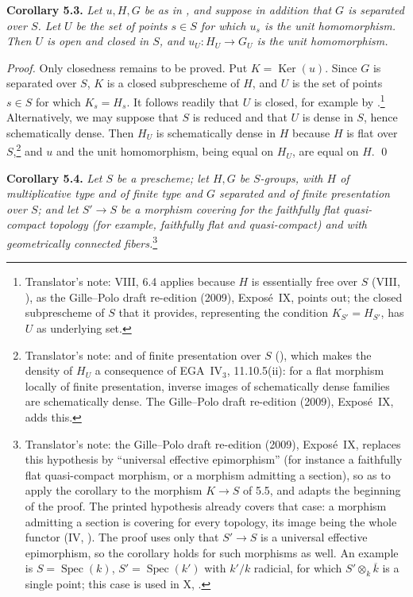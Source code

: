 \medskip
\noindent{}\textbf{Corollary 5.3.}
\textit{Let \(u,H,G\) be as in
, and suppose in addition that \(G\)
is separated over \(S\). Let \(U\) be the set of points \(s\in S\) for
which \(u_s\) is the unit homomorphism. Then \(U\) is open and closed
in \(S\), and \(u_U:H_U\to G_U\) is the unit homomorphism.}

\emph{Proof.}
Only closedness remains to be proved. Put \(K=\operatorname{Ker}(u)\).
Since \(G\) is separated over \(S\), \(K\) is a closed subprescheme of
\(H\), and \(U\) is the set of points \(s\in S\) for which \(K_s=H_s\).
It follows readily that \(U\) is closed, for example by
.\footnote{Translator's note: VIII, 6.4 applies because \(H\) is
essentially free over \(S\) (VIII,
), as the Gille--Polo draft
re-edition (2009), Expos\'e~IX, points out; the closed subprescheme of
\(S\) that it provides, representing the condition \(K_{S'}=H_{S'}\), has
\(U\) as underlying set.} Alternatively, we may suppose
that \(S\) is reduced and that \(U\) is dense in \(S\), hence
schematically dense. Then \(H_U\) is schematically dense in \(H\)
because \(H\) is flat over \(S\),\footnote{Translator's note: and of
finite presentation over \(S\)
(), which makes the
density of \(H_U\) a consequence of EGA~IV\(_3\), 11.10.5(ii): for a flat
morphism locally of finite presentation, inverse images of schematically
dense families are schematically dense. The Gille--Polo draft re-edition
(2009), Expos\'e~IX, adds this.}
and \(u\) and the unit homomorphism, being equal on \(H_U\), are equal
on \(H\). \qed

\medskip
\noindent{}\textbf{Corollary 5.4.}
\textit{Let \(S\) be a prescheme; let \(H,G\) be \(S\)-groups, with
\(H\) of multiplicative type and of finite type and \(G\) separated
and of finite presentation over \(S\); and let
\(S'\to S\) be a morphism covering for the faithfully flat quasi-compact
topology (for example, faithfully flat and quasi-compact) and with
geometrically connected fibers.}\footnote{Translator's note: the
Gille--Polo draft re-edition (2009), Expos\'e~IX, replaces this
hypothesis by ``universal effective epimorphism'' (for instance a
faithfully flat quasi-compact morphism, or a morphism admitting a
section), so as to apply the corollary to the morphism \(K\to S\) of 5.5,
and adapts the beginning of the proof. The printed hypothesis already
covers that case: a morphism admitting a section is covering for every
topology, its image being the whole functor (IV,
). The proof uses only that
\(S'\to S\) is a universal effective epimorphism, so the corollary holds
for such morphisms as well. An example is \(S=\operatorname{Spec}(k)\),
\(S'=\operatorname{Spec}(k')\) with \(k'/k\) radicial, for which
\(S'\otimes_k\overline k\) is a single point; this case is used in X,
.}

